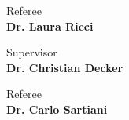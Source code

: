 \begin{titlepage}
\begin{minipage}[t]{0.47\textwidth}
	{\large{Referee}\bf\\ {Dr. Laura Ricci}}
\end{minipage}
\hfill
\begin{minipage}[t]{0.47\textwidth}
    \raggedleft
    {\large{Supervisor}\bf\\ {Dr. Christian Decker}}
\end{minipage}

\begin{center}
    {\large{Referee}\bf\\ {Dr. Carlo Sartiani}}
\end{center}

\vspace{5mm}

\end{titlepage}
